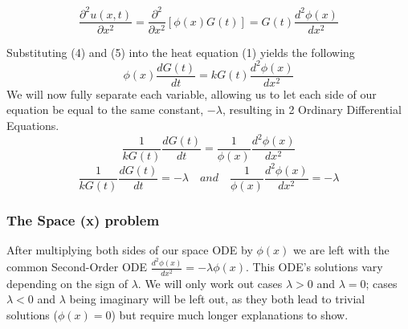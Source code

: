 \documentclass[12pt, reqno]{amsart}
\begin{document}
\begin{equation}
\frac{\partial^2{u(x,t)}}{\partial{x^2}} = \frac{\partial^2}{\partial{x^2}}[\phi(x)G(t)] = G(t)\frac{d^2\phi(x)}{dx^2}
\end{equation}
\begin{center}Substituting (4) and (5) into the heat equation (1) yields the following
\begin{equation*}
\phi(x)\frac{dG(t)}{dt} = kG(t)\frac{d^2\phi(x)}{dx^2}
\end{equation*}
We will now fully separate each variable, allowing us to let each side of our equation be equal to the same constant, $-\lambda$, resulting in 2 Ordinary Differential Equations.
\begin{equation*}
\frac{1}{kG(t)}\frac{dG(t)}{dt} = \frac{1}{\phi(x)}\frac{d^2\phi(x)}{dx^2}
\end{equation*}
\begin{equation*}
\frac{1}{kG(t)}\frac{dG(t)}{dt} = -\lambda \quad and \quad \frac{1}{\phi(x)}\frac{d^2\phi(x)}{dx^2} = -\lambda
\end{equation*}
\end{center}
\subsubsection{The Space (x) problem }After multiplying both sides of our space ODE by $\phi(x)$ we are left with the common Second-Order ODE $\frac{d^2\phi(x)}{dx^2} = -\lambda\phi(x)$. This ODE's solutions vary depending on the sign of $\lambda$. We will only work out cases $\lambda > 0$ and $\lambda = 0$; cases $\lambda < 0$ and $\lambda$ being imaginary will be left out, as they both lead to trivial solutions ($\phi(x) = 0$) but require much longer explanations to show. \cite{1}
\end{document}
